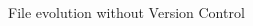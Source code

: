 \documentclass[xcolor=x11names,compress]{beamer}
\renewcommand{\(}{\begin{columns}}
\renewcommand{\)}{\end{columns}}
\newcommand{\<}[1]{\begin{column}{#1}}
\renewcommand{\>}{\end{column}}
\begin{document}
\begin{frame}{File evolution  \textcolor{brique}{without Version Control}  }
\begin{columns}[t]
\begin{column}{0.6\textwidth}
\begin{itemize}[<+->]
    \end{itemize}
 \end{column}
  \begin{column}{0.4\textwidth}
    \begin{center}
    \begin{itemize}

    \end{itemize}
    \end{center}
  \end{column}
\end{columns}
\end{frame}
\end{document}

